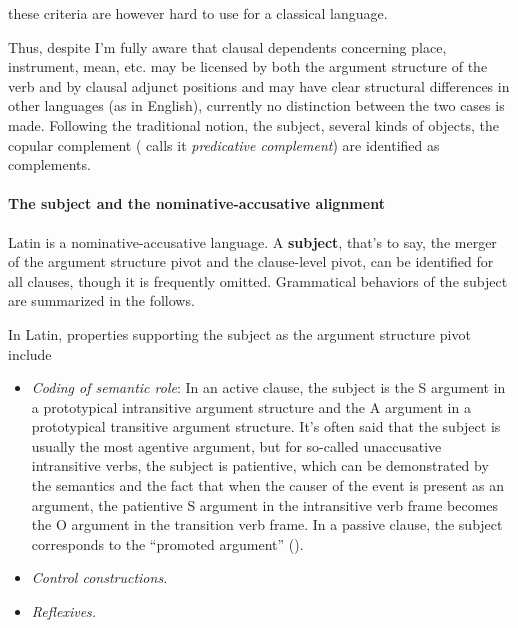 \documentclass[a4paper, oneside, 12pt]{report}
\newcommand*{\concept}[1]{\textbf{#1}}
\newcommand*{\term}[1]{\emph{#1}}
\begin{document}
these criteria are however hard to use for a classical language. 

Thus, despite I'm fully aware that  
clausal dependents concerning place, instrument, mean, etc. 
may be licensed by both the argument structure of the verb 
and by clausal adjunct positions 
and may have clear structural differences in other languages 
(as in English), 
currently no distinction between the two cases is made.
Following the traditional notion,
the subject, several kinds of objects,
the copular complement (\cite{cgel} calls it \term{predicative complement}) 
are identified as complements.

\paragraph*{The subject and the nominative-accusative alignment} Latin is a nominative-accusative language.
A \concept{subject}, that's to say, the merger of 
the argument structure pivot and the clause-level pivot, 
can be identified for all clauses, 
though it is frequently omitted.
Grammatical behaviors of the subject are summarized in the follows.

In Latin, properties supporting the subject as the argument structure pivot include
\begin{itemize}
    \item \emph{Coding of semantic role}: In an active clause, 
    the subject 
    is the S argument in a prototypical intransitive argument structure 
    and the A argument in a prototypical transitive argument structure.
    It's often said that the subject is usually the most agentive argument,
    but for so-called unaccusative intransitive verbs, 
    the subject is patientive,
    which can be demonstrated by the semantics 
    and the fact that when the causer of the event is present as an argument, 
    the patientive S argument in the intransitive verb frame
    becomes the O argument in the transition verb frame.
    In a passive clause, 
    the subject corresponds to the ``promoted argument'' ().  
    \item \emph{Control constructions.} 
    \item \emph{Reflexives.}
\end{itemize}
\end{document}
